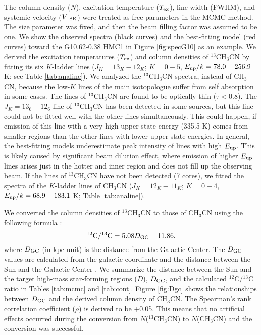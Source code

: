 \documentclass[twocolumn, twocolappendix]{aastex631}
\begin{document}
The column density ($N$), excitation temperature ($T_{\rm {ex}}$), line width (FWHM), and systemic velocity ($V_{\rm {LSR}}$) were treated as free parameters in the MCMC method.
The size parameter was fixed, and then the beam filling factor was assumed to be one.
We show the observed spectra (black curves) and the best-fitting model (red curves) toward the G10.62-0.38 HMC1 in Figure \ref{fig:specG10} as an example.
We derived the excitation temperatures ($T_{\rm {ex}}$) and column densities of $^{13}$CH$_{3}$CN by fitting its six $K$-ladder lines ($J_K=13_K-12_K$; $K=0-5$, $E_{\rm {up}}/k=78.0-256.9$ K; see Table \ref{tab:analine}).
We analyzed the $^{13}$CH$_{3}$CN spectra, instead of CH$_{3}$CN, because the low-$K$ lines of the main isotopologue suffer from self absorption in some cases.
The lines of $^{13}$CH$_{3}$CN are found to be optically thin ($\tau < 0.8$).
The $J_{K}=13_{6}-12_{6}$ line of $^{13}$CH$_{3}$CN has been detected in some sources, but this line could not be fitted well with the other lines simultaneously.
This could happen, if emission of this line with a very high upper state energy (335.5 K) comes from smaller regions than the other lines with lower upper state energies.
In general, the best-fitting models underestimate peak intensity of lines with high $E_{\rm {up}}$.
This is likely caused by significant beam dilution effect, where emission of higher $E_{\rm {up}}$ lines arises just in the hotter and inner region and does not fill up the observing beam.
If the lines of $^{13}$CH$_{3}$CN have not been detected (7 cores), we fitted the spectra of the $K$-ladder lines of CH$_{3}$CN ($J_K=12_K-11_K$; $K=0-4$, $E_{\rm {up}}/k=68.9-183.1$ K; Table \ref{tab:analine}).

We converted the column densities of $^{13}$CH$_{3}$CN to those of CH$_{3}$CN using the following formula \citep{2019ApJ...877..154Y}: 
\begin{equation}
^{12}{\rm{C}}/^{13}{\rm{C}} = 5.08 D_{\rm {GC}} + 11.86,
\end{equation}
where $D_{\rm {GC}}$ (in kpc unit) is the distance from the Galactic Center.
The $D_{\rm {GC}}$ values are calculated from the galactic coordinate and the distance between the Sun and the Galactic Center \citep[8 kpc;][]{2003ApJ...597L.121E}.
We summarize the distance between the Sun and the target high-mass star-forming regions ($D$), $D_{\rm {GC}}$, and the calculated $^{12}$C/$^{13}$C ratio in Tables \ref{tab:mcmc} and \ref{tab:cont}. 
Figure \ref{fig:Dgc} shows the relationships between $D_{\rm {GC}}$ and the derived column density of CH$_{3}$CN.
The Spearman's rank correlation coefficient ($\rho$) is derived to be +0.05. 
This means that no artificial effects occurred during the conversion from $N$($^{13}$CH$_{3}$CN) to $N$(CH$_{3}$CN) and the conversion was successful.
\end{document}
